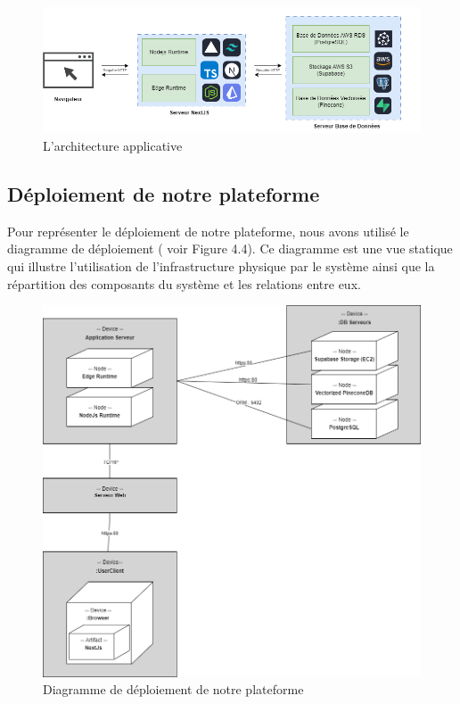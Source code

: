 \begin{figure}[H]
    \centering
    \includegraphics[width=1.15\textwidth, height=0.5\textwidth]{images/chp4/fig3.png}
    \caption{L’architecture applicative}
    \label{fig:architecture-applicative}    
\end{figure}

\subsection{Déploiement de notre plateforme}
Pour représenter le déploiement de notre plateforme, nous avons utilisé le diagramme de déploiement ( voir Figure 4.4). Ce diagramme est une vue statique qui illustre l'utilisation de l'infrastructure physique par le système ainsi que la  répartition des composants du système et les relations entre eux.
\begin{figure}[H]
    \centering
    \includegraphics[width=\textwidth,height=0.8\textwidth]{images/chp4/fig4.png}
    \caption{Diagramme de déploiement de notre plateforme}
    \label{fig:Diagramme de déploiement de notre plateforme}    
\end{figure}

